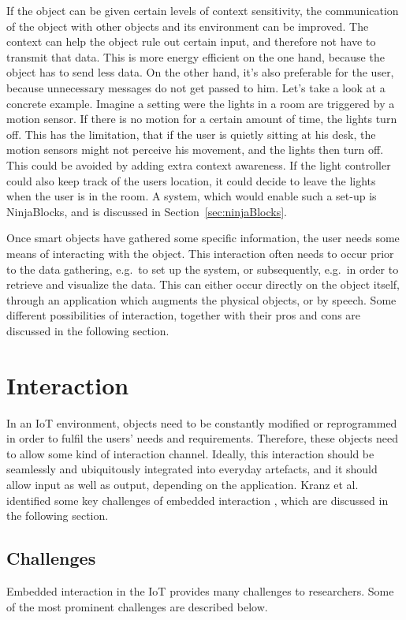 If the object can be given certain levels of context sensitivity, the communication of the object with other objects and its environment can be improved.
The context can help the object rule out certain input, and therefore not have to transmit that data.
This is more energy efficient on the one hand, because the object has to send less data.
On the other hand, it's also preferable for the user, because unnecessary messages do not get passed to him.
Let's take a look at a concrete example.
Imagine a setting were the lights in a room are triggered by a motion sensor.
If there is no motion for a certain amount of time, the lights turn off.
This has the limitation, that if the user is quietly sitting at his desk, the motion sensors might not perceive his movement, and the lights then turn off.
This could be avoided by adding extra context awareness.
If the light controller could also keep track of the users location, it could decide to leave the lights when the user is in the room.
A system, which would enable such a set-up is NinjaBlocks, and is discussed in Section~\ref{sec:ninjaBlocks}.


Once smart objects have gathered some specific information, the user needs some means of interacting with the object.
This interaction often needs to occur prior to the data gathering, e.g.\ to set up the system, or subsequently, e.g.\ in order to retrieve and visualize the data. This can either occur directly on the object itself, through an application which augments the physical objects, or by speech.
Some different possibilities of interaction, together with their pros and cons are discussed in the following section.

\section{Interaction}
\label{sec:interaction}
In an IoT environment, objects need to be constantly modified or reprogrammed in order to fulfil the users' needs and requirements. 
Therefore, these objects need to allow some kind of interaction channel. 
Ideally, this interaction should be seamlessly and ubiquitously integrated into everyday artefacts, and it should allow input as well as output, depending on the application. 
Kranz et al. identified some key challenges of embedded interaction \cite{kranz10}, which are discussed in the following section.

\subsection{Challenges}
\label{sec:challenges}
Embedded interaction in the IoT provides many challenges to researchers. Some of the most prominent challenges are described below.

